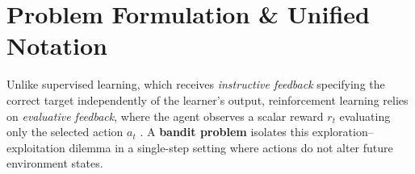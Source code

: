 \documentclass[../../../../master.tex]{subfiles}
\begin{document}
\setlength{\emergencystretch}{2.5em}

\section{Problem Formulation \& Unified Notation}
\label{sec:bandit:formulation}

Unlike supervised learning, which receives \emph{instructive feedback} specifying the correct target independently of the learner's output, reinforcement learning relies on \emph{evaluative feedback}, where the agent observes a scalar reward $r_t$ evaluating only the selected action $a_t$ . A \textbf{bandit problem} isolates this exploration--exploitation dilemma in a single-step setting where actions do not alter future environment states.
\end{document}
